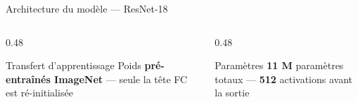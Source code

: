 \documentclass[aspectratio=169, 12pt]{beamer}
\begin{document}
\begin{frame}{Architecture du modèle — ResNet-18}
\begin{center}
  \end{center}

  \vspace{-0.2em}
  \begin{columns}
    \begin{column}{0.48\textwidth}
      \begin{exampleblock}{Transfert d'apprentissage}
        Poids \textbf{pré-entraînés ImageNet} —
        seule la tête FC est ré-initialisée
      \end{exampleblock}
    \end{column}
    \begin{column}{0.48\textwidth}
      \begin{exampleblock}{Paramètres}
        \textbf{11 M} paramètres totaux —
        \textbf{512} activations avant la sortie
      \end{exampleblock}
    \end{column}
  \end{columns}
\end{frame}
\end{document}
